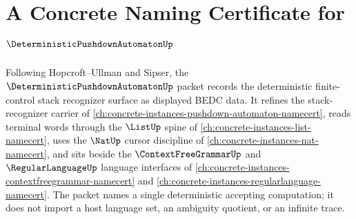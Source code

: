 \chapter{A Concrete Naming Certificate for $\DeterministicPushdownAutomatonUp$}
\label{ch:concrete-instances-deterministic-pushdown-automaton-namecert}

Following Hopcroft--Ullman and Sipser, the
$\DeterministicPushdownAutomatonUp$ packet records the deterministic
finite-control stack recognizer surface as displayed BEDC data. It refines
the stack-recognizer carrier of
\autoref{ch:concrete-instances-pushdown-automaton-namecert}, reads terminal
words through the $\ListUp$ spine of \autoref{ch:concrete-instances-list-namecert},
uses the $\NatUp$ cursor discipline of \autoref{ch:concrete-instances-nat-namecert},
and sits beside the $\ContextFreeGrammarUp$ and $\RegularLanguageUp$ language
interfaces of \autoref{ch:concrete-instances-contextfreegrammar-namecert} and
\autoref{ch:concrete-instances-regularlanguage-namecert}. The packet names a
single deterministic accepting computation; it does not import a host
language set, an ambiguity quotient, or an infinite trace.

